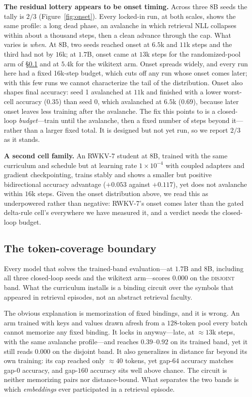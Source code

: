 \documentclass{article}
\newcommand{\disj}{\textsc{disjoint}}
\begin{document}
\textbf{The residual lottery appears to be onset timing.} Across three $8$B seeds the tally is $2/3$ (Figure~\ref{fig:onset}). Every locked-in run, at both scales, shows the same profile: a long dead phase, an avalanche in which retrieval NLL collapses within about a thousand steps, then a clean advance through the cap. What varies is \emph{when}. At $8$B, two seeds reached onset at $6.5$k and $11$k steps and the third had not by $16$k; at $1.7$B, onset came at $13$k steps for the randomized-pool arm of \S\ref{sec:coverage} and at $5.4$k for the wikitext arm. Onset spreads widely, and every run here had a fixed 16k-step budget, which cuts off any run whose onset comes later; with this few runs we cannot characterize the tail of the distribution. Onset also shapes final accuracy: seed 1 avalanched at $11$k and finished with a lower worst-cell accuracy ($0.35$) than seed 0, which avalanched at $6.5$k ($0.69$), because later onset leaves less training after the avalanche. The fix this points to is a closed-loop \emph{budget}---train until the avalanche, then a fixed number of steps beyond it---rather than a larger fixed total. It is designed but not yet run, so we report $2/3$ as it stands.

\textbf{A second cell family.} An RWKV-7 student at $8$B, trained with the same curriculum and schedule but at learning rate $1{\times}10^{-4}$ with coupled adapters and gradient checkpointing, trains stably and shows a smaller but positive bidirectional accuracy advantage ($+0.053$ against $+0.117$), yet does not avalanche within $16$k steps. Given the onset distribution above, we read this as underpowered rather than negative: RWKV-7's onset comes later than the gated delta-rule cell's everywhere we have measured it, and a verdict needs the closed-loop budget.

\subsection{The token-coverage boundary}\label{sec:coverage}

Every model that solves the trained-band evaluation---at $1.7$B and $8$B, including all three closed-loop seeds and the wikitext arm---scores $0.000$ on the \disj{} band. What the curriculum installs is a binding circuit over the symbols that appeared in retrieval episodes, not an abstract retrieval faculty.

The obvious explanation is memorization of fixed bindings, and it is wrong. An arm trained with keys and values drawn afresh from a $128$-token pool every batch cannot memorize any fixed binding. It locks in anyway---late, at ${\approx}13$k steps, with the same avalanche profile---and reaches $0.39$--$0.92$ on its trained band, yet it still reads $0.000$ on the disjoint band. It also generalizes in distance far beyond its own training: its cap reached only ${\approx}40$ tokens, yet gap-$64$ accuracy matches gap-$0$ accuracy, and gap-$160$ accuracy sits well above chance. The circuit is neither memorizing pairs nor distance-bound. What separates the two bands is which \emph{embeddings} ever participated in a retrieval episode.
\end{document}
